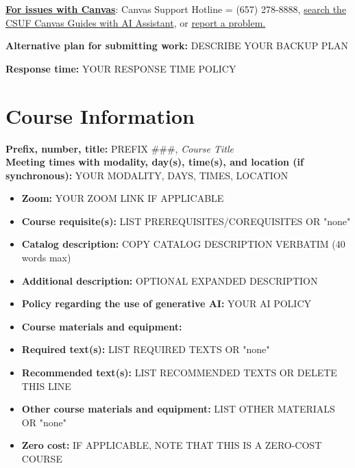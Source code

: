 \documentclass[12pt]{article}
\begin{document}
\vspace{0.5em}
\noindent \textbf{\underline{For issues with Canvas}}: Canvas Support Hotline = (657) 278-8888, \href{https://canvashelp.fullerton.edu/}{search the CSUF Canvas Guides with AI Assistant}, or \href{https://titans.service-now.com/sp?id=sc_cat_item&sys_id=f88efe80ebea6a10fb7cfcffcad0cdc6&subject=Canvas}{report a problem.}

\vspace{0.5em}
\noindent \textbf{Alternative plan for submitting work:} DESCRIBE YOUR BACKUP PLAN

\vspace{0.5em}
\noindent \textbf{Response time:} YOUR RESPONSE TIME POLICY

\section*{Course Information}
\noindent \textbf{Prefix, number, title:} PREFIX \#\#\#, \textit{Course Title} \\
\noindent \textbf{Meeting times with modality, day(s), time(s), and location (if synchronous):} 
YOUR MODALITY, DAYS, TIMES, LOCATION

\vspace{0.5em}
\begin{itemize}[label={}, leftmargin=0pt]
\item \textbf{Zoom:} YOUR ZOOM LINK IF APPLICABLE
\item \textbf{Course requisite(s):} LIST PREREQUISITES/COREQUISITES OR "none"
\item \textbf{Catalog description:} COPY CATALOG DESCRIPTION VERBATIM (40 words max)
\item \textbf{Additional description:} OPTIONAL EXPANDED DESCRIPTION
\item \textbf{Policy regarding the use of generative AI:} YOUR AI POLICY
\item \textbf{Course materials and equipment:} ~
\item \textbf{Required text(s):} LIST REQUIRED TEXTS OR "none"
\item \textbf{Recommended text(s):} LIST RECOMMENDED TEXTS OR DELETE THIS LINE
\item \textbf{Other course materials and equipment:} LIST OTHER MATERIALS OR "none"
\item \textbf{Zero cost:} IF APPLICABLE, NOTE THAT THIS IS A ZERO-COST COURSE
\end{itemize}
\end{document}
